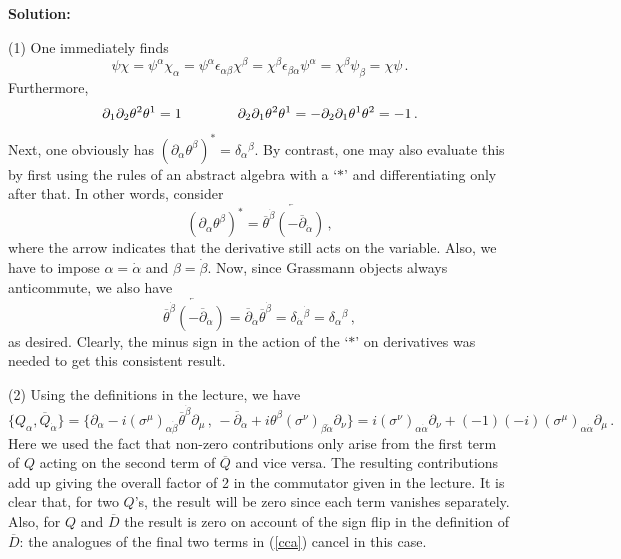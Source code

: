 \documentclass[12pt]{article}
\newcommand{\be}{\begin{equation}}
\newcommand{\ee}{\end{equation}}
\newcommand{\ol}{\overline}
\numberwithin{equation}{section}
\begin{document}
\noindent
{\bf Solution:}

\noindent
(1) One immediately finds
\be
\psi\chi=\psi^\alpha\chi_\alpha=\psi^\alpha \epsilon_{\alpha\beta}\chi^\beta=
\chi^\beta\epsilon_{\beta\alpha}\psi^\alpha=\chi^\beta\psi_\beta=\chi\psi\,.
\ee
Furthermore,
\be
\partial_1\partial_2\theta^2\theta^1=1\qquad \mbox{\qquad} \partial_2\partial_1\theta^2\theta^1=-\partial_2\partial_1\theta^1\theta^2=-1\,.
\ee
Next, one obviously has $(\partial_\alpha\theta^\beta)^*=\delta_\alpha{}^\beta$. By contrast, one may also evaluate this by first using the rules of an abstract algebra with a `$*$' and differentiating only after that. In other words, consider 
\be
(\partial_\alpha\theta^\beta)^*=\overleftarrow{\ol{\theta}^{\dot{\beta}} (-\ol{\partial}_{\dot{\alpha}})}\,,
\ee
where the arrow indicates that the derivative still acts on the variable. Also, we have to impose $\alpha=\dot{\alpha}$ and $\beta=\dot{\beta}$. Now, since Grassmann objects always anticommute, we also have
\be
\overleftarrow{\ol{\theta}^{\dot{\beta}} (-\ol{\partial}_{\dot{\alpha}})}
=\ol{\partial}_{\dot{\alpha}}\ol{\theta}^{\dot{\beta}}=\delta_{\dot{\alpha}}{}^{\dot{\beta}}=\delta_\alpha{}^\beta\,,
\ee
as desired. Clearly, the minus sign in the action of the `$*$' on derivatives was needed to get this consistent result. 

\noindent
(2) Using the definitions in the lecture, we have
\be
\{Q_\alpha,\ol{Q}_{\dot{\alpha}}\}=\{\partial_\alpha-i(\sigma^\mu)_{\alpha\dot{\beta}}\ol{\theta}^{\dot{\beta}}\partial_\mu\,,\,-\ol{\partial}_{\dot{\alpha}}+i\theta^\beta (\sigma^\nu)_{\beta\dot{\alpha}}\partial_\nu\} = i(\sigma^\nu)_{\alpha\dot{\alpha}}\partial_\nu+(-1)(-i)(\sigma^\mu)_{\alpha\dot{\alpha}}\partial_\mu\,.\label{cca}
\ee
Here we used the fact that non-zero contributions only arise from the first term of $Q$ acting on the second term of $\ol{Q}$ and vice versa. The resulting contributions add up giving the overall factor of 2 in the commutator given in the lecture. It is clear that, for two $Q$'s, the result will be zero since each term vanishes separately. Also, for $Q$ and $\ol{D}$ the result is zero on account of the sign flip in the definition of $\ol{D}$: the analogues of the final two terms in (\ref{cca}) cancel in this case.
\end{document}
